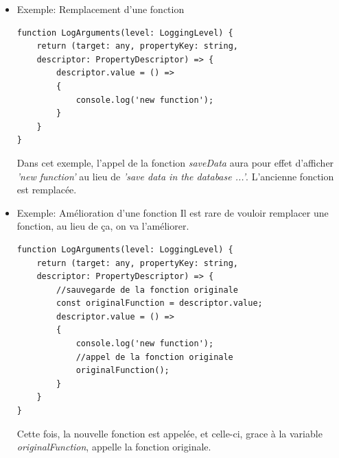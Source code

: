 \documentclass[12pt,oneside]{scrbook}
\begin{document}
\begin{itemize}
\item Exemple: Remplacement d'une fonction
\begin{verbatim}
function LogArguments(level: LoggingLevel) {
    return (target: any, propertyKey: string, 
    descriptor: PropertyDescriptor) => {
        descriptor.value = () =>
        {
            console.log('new function');
        }
    }
}
\end{verbatim}
Dans cet exemple, l'appel de la fonction \textit{saveData} aura pour effet d'afficher \textit{'new function'} au lieu de \textit{'save data in the database ...'}. L'ancienne fonction est remplacée.
\item Exemple: Amélioration d'une fonction
Il est rare de vouloir remplacer une fonction, au lieu de ça, on va l'améliorer.
\begin{verbatim}
function LogArguments(level: LoggingLevel) {
    return (target: any, propertyKey: string, 
    descriptor: PropertyDescriptor) => {
        //sauvegarde de la fonction originale
        const originalFunction = descriptor.value;
        descriptor.value = () =>
        {
            console.log('new function');
            //appel de la fonction originale
            originalFunction();
        }
    }
}
\end{verbatim}
Cette fois, la nouvelle fonction est appelée, et celle-ci, grace à la variable \textit{originalFunction}, appelle la fonction originale.
\end{itemize}


\backmatter 

\printindex 
\end{document}
